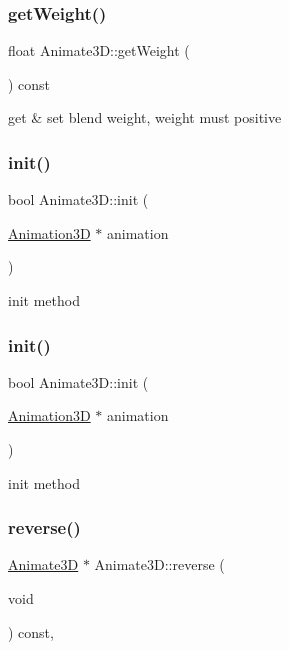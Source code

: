 \subsubsection{\texorpdfstring{get\+Weight()}{getWeight()}\hspace{0.1cm}{\footnotesize\ttfamily [2/2]}}
{\footnotesize\ttfamily float Animate3\+D\+::get\+Weight (\begin{DoxyParamCaption}{ }\end{DoxyParamCaption}) const\hspace{0.3cm}{\ttfamily [inline]}}

get \& set blend weight, weight must positive \mbox{\label{classAnimate3D_a08ca260aabb4f6569dd1ced348309aaf}} 
\subsubsection{\texorpdfstring{init()}{init()}\hspace{0.1cm}{\footnotesize\ttfamily [1/2]}}
{\footnotesize\ttfamily bool Animate3\+D\+::init (\begin{DoxyParamCaption}\item[{\hyperlink{classAnimation3D}{Animation3D} $\ast$}]{animation }\end{DoxyParamCaption})}

init method \mbox{\label{classAnimate3D_a08ca260aabb4f6569dd1ced348309aaf}} 
\subsubsection{\texorpdfstring{init()}{init()}\hspace{0.1cm}{\footnotesize\ttfamily [2/2]}}
{\footnotesize\ttfamily bool Animate3\+D\+::init (\begin{DoxyParamCaption}\item[{\hyperlink{classAnimation3D}{Animation3D} $\ast$}]{animation }\end{DoxyParamCaption})}

init method \mbox{\label{classAnimate3D_aa8acc0668132f57fee370bfdbea308cb}} 
\subsubsection{\texorpdfstring{reverse()}{reverse()}\hspace{0.1cm}{\footnotesize\ttfamily [1/2]}}
{\footnotesize\ttfamily \hyperlink{classAnimate3D}{Animate3D} $\ast$ Animate3\+D\+::reverse (\begin{DoxyParamCaption}\item[{void}]{ }\end{DoxyParamCaption}) const\hspace{0.3cm}{\ttfamily [override]}, {\ttfamily [virtual]}}

